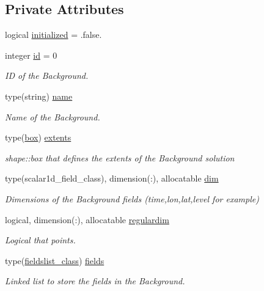 \subsection*{Private Attributes}
\begin{DoxyCompactItemize}
\item 
logical \mbox{\hyperlink{structbackground__mod_1_1background__class_aeb3f1a195165888bc63066aed03d651b}{initialized}} = .false.
\item 
integer \mbox{\hyperlink{structbackground__mod_1_1background__class_a1b3eabdda94ffdb97b6bb0db385edfd8}{id}} = 0
\begin{DoxyCompactList}\small\item\em ID of the Background. \end{DoxyCompactList}\item 
type(string) \mbox{\hyperlink{structbackground__mod_1_1background__class_a4f812fd2adfe5d1e50db63e75e460022}{name}}
\begin{DoxyCompactList}\small\item\em Name of the Background. \end{DoxyCompactList}\item 
type(\mbox{\hyperlink{structgeometry__mod_1_1box}{box}}) \mbox{\hyperlink{structbackground__mod_1_1background__class_acaaef54168dbee2731a99d0852844844}{extents}}
\begin{DoxyCompactList}\small\item\em shape\+::box that defines the extents of the Background solution \end{DoxyCompactList}\item 
type(scalar1d\+\_\+field\+\_\+class), dimension(\+:), allocatable \mbox{\hyperlink{structbackground__mod_1_1background__class_a086f319ce4f039190699578d69927013}{dim}}
\begin{DoxyCompactList}\small\item\em Dimensions of the Background fields (time,lon,lat,level for example) \end{DoxyCompactList}\item 
logical, dimension(\+:), allocatable \mbox{\hyperlink{structbackground__mod_1_1background__class_a78b62368ed110d33fd809e8ff101839b}{regulardim}}
\begin{DoxyCompactList}\small\item\em Logical that points. \end{DoxyCompactList}\item 
type(\mbox{\hyperlink{structbackground__mod_1_1fieldslist__class}{fieldslist\+\_\+class}}) \mbox{\hyperlink{structbackground__mod_1_1background__class_a68b750f0476dc75b886638a45a45f8f6}{fields}}
\begin{DoxyCompactList}\small\item\em Linked list to store the fields in the Background. \end{DoxyCompactList}\end{DoxyCompactItemize}


